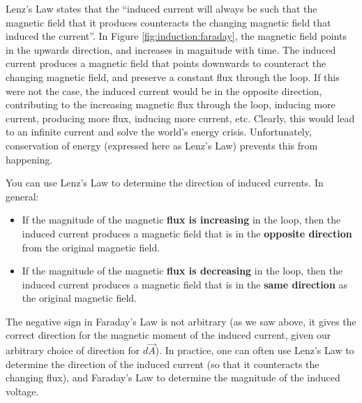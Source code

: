 Lenz's Law states that the ``induced current will always be such that the magnetic field that it produces counteracts the changing magnetic field that induced the current''. In Figure \ref{fig:induction:faraday}, the magnetic field points in the upwards direction, and increases in magnitude with time. The induced current produces a magnetic field that points downwards to counteract the changing magnetic field, and preserve a constant flux through the loop. If this were not the case, the induced current would be in the opposite direction, contributing to the increasing magnetic flux through the loop, inducing more current, producing more flux, inducing more current, etc. Clearly, this would lead to an infinite current and solve the world's energy crisis. Unfortunately, conservation of energy (expressed here as Lenz's Law) prevents this from happening. 

You can use Lenz's Law to determine the direction of induced currents. In general:
\begin{itemize}
\item If the magnitude of the magnetic \textbf{flux is increasing} in the loop, then the induced current produces a magnetic field that is in the \textbf{opposite direction} from the original magnetic field.
\item If the magnitude of the magnetic \textbf{flux is decreasing} in the loop, then the induced current produces a magnetic field that is in the \textbf{same direction} as the original magnetic field.
\end{itemize}

The negative sign in Faraday's Law is not arbitrary (as we saw above, it gives the correct direction for the magnetic moment of the induced current, given our arbitrary choice of direction for $d\vec A$). In practice, one can often use Lenz's Law to determine the direction of the induced current (so that it counteracts the changing flux), and Faraday's Law to determine the magnitude of the induced voltage.



